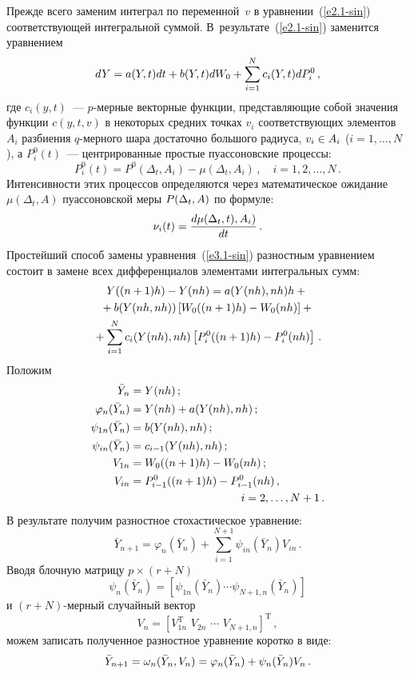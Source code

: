 \begin{multicols}{2}
Прежде всего заменим интеграл по переменной~$v$ в уравнении~(\ref{e2.1-sin})
соответствующей интегральной суммой. В~результате~(\ref{e2.1-sin})
заменится уравнением
\begin{equation}
dY=a(Y,t)dt+b(Y,t)dW_0+\sum_{i=1}^N c_i(Y,t)dP^0_i\,,\label{e3.1-sin}
\end{equation}
где $c_i(y,t)$~--- $p$-мер\-ные векторные функции, представляющие собой
значения функции $c(y,t,v)$ в некоторых средних точках $v_i$
соответствующих элементов~$A_i$ разбиения $q$-мер\-но\-го шара достаточно
большого радиуса, $v_i\hm\in A_i$ ($i=1,\ldots,N$), а $P^0_i(t)$~---
центрированные простые пуассоновские процессы:
\begin{equation*}
P^0_i(t)=P^0(\Delta_t,A_i)-\mu(\Delta_t,A_i)\,,\quad i=1,2,\ldots,N\,.
    \end{equation*}
Интенсивности этих процессов определяются через математическое
ожидание $\mu(\Delta_t, A)$  пуассоновской меры $P(\Delta_t,A)$ по формуле:
    \begin{equation*}
    \nu_i(t)=\fr{d\mu(\Delta_t,t),A_i)}{dt}\,. %
    \end{equation*}
Простейший способ замены уравнения~(\ref{e3.1-sin}) разностным уравнением состоит в замене всех дифференциалов
элементами интегральных сумм:
\begin{multline*}
Y((n+1)h)-Y(nh)=a(Y(nh),nh)h+{}\\
{}+b(Y(nh,nh)) \left[W_0((n+1)h)-
W_0(nh)\right]+{}\\
{}+\sum_{i=1}^N c_i(Y(nh),nh)\left[P_i^0((n+1)h)-P_i^0(nh)\right]\,.
\end{multline*}
Положим
\begin{align*}
\bar Y_n&=Y(nh)\,;\\ 
\varphi_n(\bar Y_n)&=Y(nh)+a(Y(nh),nh)\,;
   \\
    \psi_{1n}(\bar Y_n)&=b(Y(nh),nh)\,;\\
\psi_{in}(\bar     Y_n)&=c_{i-1}(Y(nh),nh)\,;\\
 V_{1n}&=W_0((n+1)h)-W_0(nh)\,;\\
V_{in}&=P_{i-1}^0((n+1)h)-P_{i-1}^0(nh)\,,\\
    &\hspace*{35mm}i=2,\ldots,N+1\,.
    \end{align*}
В результате получим разностное стохастическое уравнение:
    $$\bar Y_{n+1}=\varphi_n(\bar Y_n)+\sum\limits_{i=1}^{N+1}\psi_{in}(\bar Y_n)V_{in}\,.
    $$
Вводя блочную матрицу $p\times (r+N)$
\begin{equation*}
\psi_n(\bar Y_n)=\left[\psi_{1n}(\bar Y_n) \cdots \psi_{N+1,n}(\bar  Y_n)\right] %
\end{equation*}
и $(r+N)$-мер\-ный случайный вектор
\begin{equation*}
V_n=\left[V_{1n}^{\mathrm{T}}\,\, V_{2n}\,\,\cdots \,\, V_{N+1,n}\right]^{\mathrm{T}}\,, %
\end{equation*}
можем записать полученное разностное уравнение коротко в виде:
    \begin{equation}
    \bar Y_{n+1}=\omega_n (\bar Y_n, V_n)=\varphi_n(\bar Y_n)+\psi_n(\bar Y_n)V_n\,. \label{e3.7-sin}
    \end{equation}


\end{multicols}
